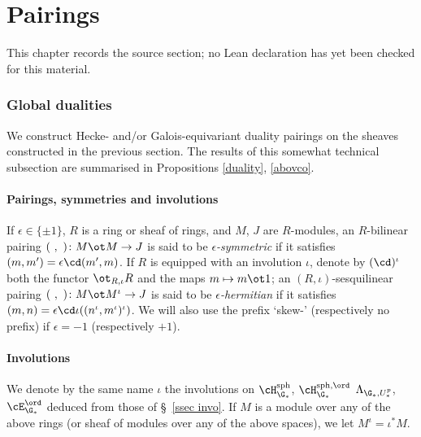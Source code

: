 \chapter{Pairings}
\label{universal-p-adic-gross-zagier-formula-chapter-04}

\begin{remark}
\label{universal-p-adic-gross-zagier-formula-chapter-04-source}
This chapter records the source section; no Lean declaration has yet been checked for this material.
\notready
\end{remark}

\subsection{Global dualities}  \label{sec: duality} We construct Hecke- and/or Galois-equivariant duality pairings on the sheaves constructed in the previous section. The results of this somewhat technical subsection are summarised in Propositions \ref{duality}, \ref{abovco}.

\subsubsection{Pairings, symmetries and involutions}
If $\epsilon \in \{\pm 1\}$,  $R$ is a ring or sheaf of rings, and $M$, $J$ are $R$-modules, an $R$-bilinear pairing $(\ ,  \ )\colon M\ot M\to J$ is said to be \emph{$\epsilon$-symmetric}  if it satisfies $(m, m')=\epsilon\cd (m', m)$. If $R$ is equipped with an involution $\iota$,  denote by  $(\cd)^{\iota}$ both the functor $\ot_{R, \iota}R$ and the maps $m\mapsto m\ot1$;  an $(R, \iota)$-sesquilinear pairing $(\ ,  \ )\colon M\ot M^{\iota}\to J$ is said to be \emph{$\epsilon$-hermitian} if it satisfies $  (m, n)= \epsilon \cd \iota ((n^{\iota}, m^{\iota})^{\iota})$.   We will also use the prefix `skew-' (respectively no prefix) if $\epsilon=-1$ (respectively $+1$).



\subsubsection{Involutions}
We denote by  the same name $\iota$  the involutions on $\cH_{\G_{*}}^{\rm sph}$, $\cH_{\G_{*}}^{\rm sph, \ord}$ $\Lambda_{\G_{*}, U^{p}_{*}} $,  $\cE_{\G_{*}}^{\ord}$ deduced from those of  \S~\ref{ssec invo}.
If $M$ is a module over any of the above rings (or sheaf of modules over any of the above spaces), we let
$M^{\iota}= \iota^{*} M$.

